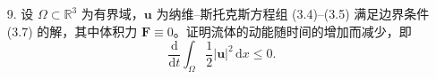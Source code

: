 \begin{itemize}
    \begin{proof}
    条件可以总结为：稳态不可压缩、定常，
    $\boldsymbol{v}=v(x,y)\boldsymbol{e}_x$，$ p=p(x)$.而方程
    可以写为：
    $$
    \begin{cases}
    \nabla\cdot\boldsymbol{v}=0,\\
    (\boldsymbol{v}\cdot\nabla)\boldsymbol{v}
    -\mu\Delta\boldsymbol{v}
    +\dfrac{1}{\rho}\nabla p=0,
    \end{cases}
    $$
    结合条件，可得：
    $$
    \nabla\cdot\boldsymbol{v}=0
    \quad\Longrightarrow\quad
    \frac{\partial v}{\partial x}=0,
    $$
    $$
    (\boldsymbol{v}\cdot\nabla)\boldsymbol{v}
    =v\frac{\partial}{\partial x}(v,0,0)=0.
    $$
    故
    $$
    \mu\frac{\partial^2v(y)}{\partial y^2}
    =\frac{1}{\rho}\frac{\partial p(x)}{\partial x}
    :=c.
    $$
    $$
    p=c\rho x+p_1,\qquad
    p=\frac{p_2-p_1}{L}x+p_1.
    $$
    $$
    v=\frac{1}{2\mu}cy^2+C_1y+C_2.
    $$
    需要边界条件（粘性流体边界上为 $0$），即$y=0,\ y=L$ 时 $v=0$，
    $$
    \Longrightarrow\quad
    v=\frac{p_1-p_2}{2\mu\rho L}y(L-y).
    $$
    \end{proof}

    \item[9.]设 $\Omega\subset\mathbb R^3$ 为有界域，$\boldsymbol{u}$ 为纳维--斯托克斯方程组 (3.4)--(3.5) 满足边界条件 (3.7) 的解，其中体积力 $\boldsymbol{F}\equiv0$。证明流体的动能随时间的增加而减少，即
    $$
    \frac{\mathrm d}{\mathrm dt}
    \int_\Omega\frac{1}{2}|\boldsymbol{u}|^2\,\mathrm dx\leq0.
    $$


\end{itemize}

